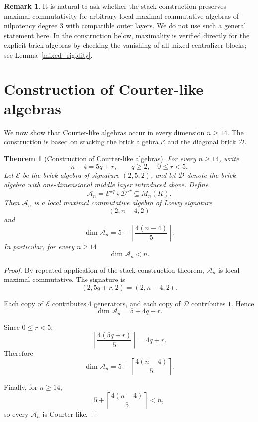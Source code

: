 \documentclass[11pt]{article}
\theoremstyle{remark}
\theoremstyle{plain}
\newtheorem{theorem}{Theorem}
\theoremstyle{definition}
\theoremstyle{myremark}
\newtheorem{remark}{Remark}
\begin{document}
\begin{remark}
	It is natural to ask whether the stack construction preserves maximal
	commutativity for arbitrary local maximal commutative algebras of nilpotency
	degree \(3\) with compatible outer layers. We do not use such a general
	statement here. In the construction below, maximality is verified directly for
	the explicit brick algebras by checking the vanishing of all mixed centralizer
	blocks; see Lemma~\ref{mixed_rigidity}.
\end{remark}





\section{Construction of Courter-like algebras}

We now show that Courter-like algebras occur in every dimension $n\ge14.$
The construction is based on stacking the brick algebra \(\mathcal E\) and
the diagonal brick \(\mathcal D\).

\begin{theorem}[Construction of Courter-like algebras]
	For every \(n\ge14\), write
	\[	n-4=5q+r,	\qquad	q\ge2,	\quad	0\le r<5.
	\]
	Let \(\mathcal E\) be the brick algebra of signature \((2,5,2)\), and let \(\mathcal D\) denote the brick algebra with one-dimensional middle layer introduced above. Define
	\[	\mathcal A_n	=	\mathcal E^{\star q}\star \mathcal D^{\star r}	\subseteq M_n(K).
	\]
	Then \(\mathcal A_n\) is a local maximal commutative algebra of Loewy
	signature
	\[
	(2,n-4,2)
	\]
	and
	\[	\dim \mathcal A_n	=	5+	\left\lceil	\frac{4(n-4)}5	\right\rceil.
	\]
	In particular, for every \(n\ge14\)
	\[	\dim\mathcal A_n<n.	\]
	
\end{theorem}

\begin{proof}
	By repeated application of the stack construction theorem, $\mathcal A_n$
	is local maximal commutative. The signature is
	\[	(2,5q+r,2)=(2,n-4,2).	\]
	
	Each copy of \(\mathcal E\) contributes \(4\) generators, and each copy
	of \(\mathcal D\) contributes \(1\). Hence
	\[	\dim \mathcal A_n=5+4q+r.	\]
	
	Since \(0\le r<5\),
	\[	\left\lceil	\frac{4(5q+r)}5	\right\rceil	=	4q+r.	\]
	Therefore
	\[	\dim \mathcal A_n=5+\left\lceil	\frac{4(n-4)}5	\right\rceil.	\]
	
	Finally, for \(n\ge14\),
	\[
	5+
	\left\lceil
	\frac{4(n-4)}5
	\right\rceil<n,
	\]
	so every \(\mathcal A_n\) is Courter-like.
\end{proof}
\end{document}
